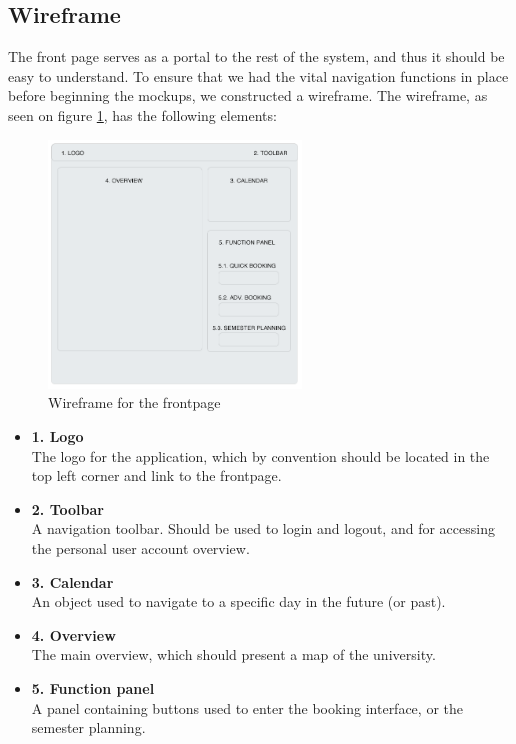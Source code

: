 \subsection{Wireframe}
\label{subsec:wireframe}
The front page serves as a portal to the rest of the system, and thus it should be easy to understand. To ensure that we had the vital navigation functions in place before beginning the mockups, we constructed a wireframe\cite{garrett}. The wireframe, as seen on figure \ref{fig:wireframe_frontpage}, has the following elements:

\begin{figure}[htb]
\begin{center}
\leavevmode
\includegraphics[width=0.6\textwidth]{images/wireframe1}
\end{center}
\caption{Wireframe for the frontpage}
\label{fig:wireframe_frontpage}
\end{figure}

\begin{itemize}
	\item \textbf{1. Logo}\\
	The logo for the application, which by convention should be located in the top left corner and link to the frontpage. \cite{steve}
	\item \textbf{2. Toolbar}\\
	A navigation toolbar. Should be used to login and logout, and for accessing the personal user account overview.
	\item \textbf{3. Calendar}\\
	An object used to navigate to a specific day in the future (or past).
	\item \textbf{4. Overview}\\
	The main overview, which should present a map of the university.
	\item \textbf{5. Function panel}\\
	A panel containing buttons used to enter the booking interface, or the semester planning.
\end{itemize}

